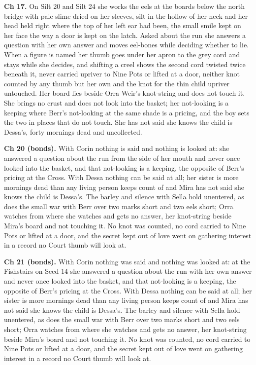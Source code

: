 \documentclass{design/chronicle}
\begin{document}
{\textbf{Ch 17.} On Silt 20 and Silt 24 she works the eels at the boards below the north bridge with pale slime dried on her sleeves, silt in the hollow of her neck and her head held right where the top of her left ear had been, the small smile kept on her face the way a door is kept on the latch. Asked about the run she answers a question with her own answer and moves eel-bones while deciding whether to lie. When a figure is named her thumb goes under her apron to the grey cord and stays while she decides, and shifting a creel shows the second cord twisted twice beneath it, never carried upriver to Nine Pots or lifted at a door, neither knot counted by any thumb but her own and the knot for the thin child upriver untouched. Her board lies beside Orra Weir’s knot-string and does not touch it. She brings no crust and does not look into the basket; her not-looking is a keeping where Berr’s not-looking at the same shade is a pricing, and the boy sets the two in places that do not touch. She has not said she knows the child is Dessa’s, forty mornings dead and uncollected.

\textbf{Ch 20 (bonds).} With Corin nothing is said and nothing is looked at: she answered a question about the run from the side of her mouth and never once looked into the basket, and that not-looking is a keeping, the opposite of Berr’s pricing at the Cross. With Dessa nothing can be said at all; her sister is more mornings dead than any living person keeps count of and Mira has not said she knows the child is Dessa’s. The barley and silence with Sella hold unentered, as does the small war with Berr over two marks short and two eels short; Orra watches from where she watches and gets no answer, her knot-string beside Mira’s board and not touching it. No knot was counted, no cord carried to Nine Pots or lifted at a door, and the secret kept out of love went on gathering interest in a record no Court thumb will look at.

\textbf{Ch 21 (bonds).} With Corin nothing was said and nothing was looked at: at the Fishstairs on Seed 14 she answered a question about the run with her own answer and never once looked into the basket, and that not-looking is a keeping, the opposite of Berr’s pricing at the Cross. With Dessa nothing can be said at all; her sister is more mornings dead than any living person keeps count of and Mira has not said she knows the child is Dessa’s. The barley and silence with Sella hold unentered, as does the small war with Berr over two marks short and two eels short; Orra watches from where she watches and gets no answer, her knot-string beside Mira’s board and not touching it. No knot was counted, no cord carried to Nine Pots or lifted at a door, and the secret kept out of love went on gathering interest in a record no Court thumb will look at.

}
\end{document}
